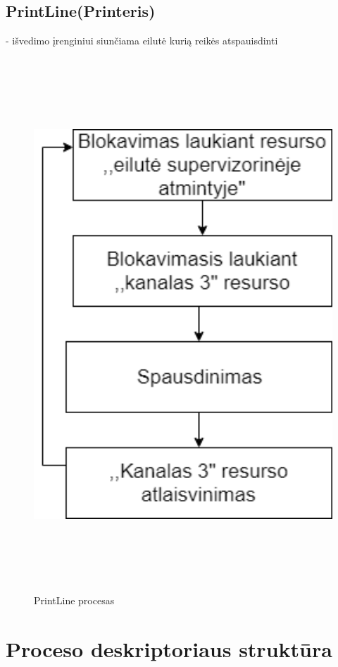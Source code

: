 \documentclass[oneside]{VUMIFPSkursinis}
\begin{document}
\subsection{PrintLine(Printeris)} - išvedimo įrenginiui siunčiama eilutė kurią reikės atspauisdinti
\begin{figure}[H]
		\centering	
	\includegraphics[width=18cm,height=20cm,keepaspectratio]{PrintLine.png}
	\caption{PrintLine procesas}
	\label{fig:PrintLine procesas}
\end{figure}



\section{Proceso deskriptoriaus struktūra}
\end{document}
